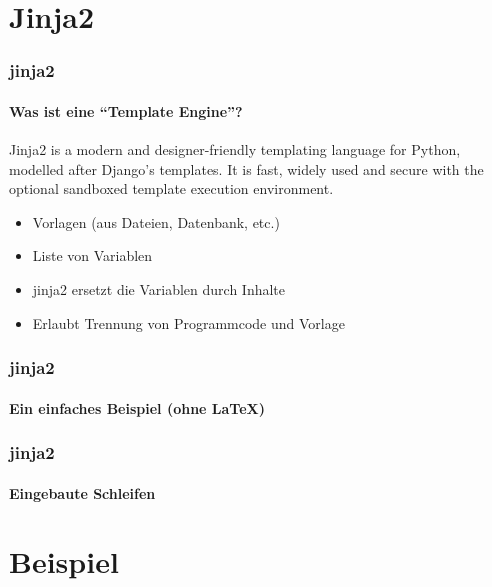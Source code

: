 \documentclass[12pt,ngerman]{beamer}
\begin{document}
\section{Jinja2}


\begin{frame}
\frametitle{jinja2}
\framesubtitle{Was ist eine \enquote{Template Engine}?}

\begin{infobox}
Jinja2 is a modern and designer-friendly templating language for Python, modelled after Django’s templates. It is fast, widely used and secure with the optional sandboxed template execution environment.
\end{infobox}

\begin{itemize}
	\item Vorlagen (aus Dateien, Datenbank, etc.)
	\item Liste von Variablen
	\item jinja2 ersetzt die Variablen durch Inhalte
	\item Erlaubt Trennung von Programmcode und Vorlage
\end{itemize}

\end{frame}

\begin{frame}[fragile]
\frametitle{jinja2}
\framesubtitle{Ein einfaches Beispiel (ohne \LaTeX)}

 

 

\end{frame}

\begin{frame}[fragile]
\frametitle{jinja2}
\framesubtitle{Eingebaute Schleifen}

 

\end{frame}




\section{Beispiel}
\end{document}
